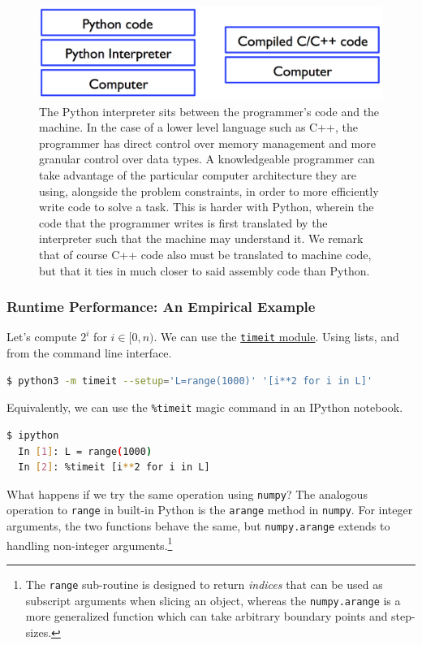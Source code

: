 \documentclass[12pt,letterpaper,twoside]{article}
\begin{document}
\begin{figure}[h]
\centering
\includegraphics[scale=0.45]{fig/python-v-compiled.png}
\caption{\footnotesize The Python interpreter sits between the programmer's code and
the machine. In the case of a lower level language such as C++, the
programmer has direct control over memory management and more granular
control over data types. A knowledgeable programmer can take advantage
of the particular computer architecture they are using, alongside the
problem constraints, in order to more efficiently write code to solve
a task. This is harder with Python, wherein the code that the
programmer writes is first translated by the interpreter such that the
machine may understand it. We remark that of course C++ code also must
be translated to machine code, but that it ties in much closer to said
assembly code than Python.}
\end{figure}

\subsubsection{Runtime Performance: An Empirical Example}
Let's compute \(2^i\) for \(i \in [0,n)\). We can use the
\href{https://docs.python.org/3/library/timeit.html#basic-examples}{\texttt{timeit} module}.
Using lists, and from the command line
interface.

\begin{lstlisting}[language=bash,basicstyle=\small]
  $ python3 -m timeit --setup='L=range(1000)' '[i**2 for i in L]'
\end{lstlisting}

Equivalently, we can use the \texttt{\%timeit} magic command in an
IPython notebook.

\begin{lstlisting}[language=bash,basicstyle=\small]
  $ ipython
  In [1]: L = range(1000)
  In [2]: %timeit [i**2 for i in L]
\end{lstlisting}

What happens if we try the same operation using \texttt{numpy}? The
analogous operation to \texttt{range} in built-in Python is the
\texttt{arange} method in \texttt{numpy}. For integer arguments, the
two functions behave the same, but \texttt{numpy.arange} extends to
handling non-integer arguments.\footnote{The \texttt{range}
  sub-routine is designed to return \emph{indices} that can be used as
  subscript arguments when slicing an object, whereas the
  \texttt{numpy.arange} is a more generalized function which can take
  arbitrary boundary points and step-sizes.}
\end{document}
